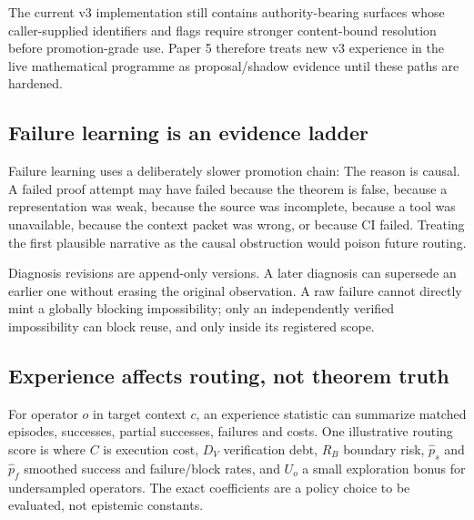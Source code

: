 The current v3 implementation still contains authority-bearing surfaces whose caller-supplied identifiers and flags require stronger content-bound resolution before promotion-grade use. Paper 5 therefore treats new v3 experience in the live mathematical programme as proposal/shadow evidence until these paths are hardened.

\subsection{Failure learning is an evidence ladder}

Failure learning uses a deliberately slower promotion chain:
The reason is causal. A failed proof attempt may have failed because the theorem is false, because a representation was weak, because the source was incomplete, because a tool was unavailable, because the context packet was wrong, or because CI failed. Treating the first plausible narrative as the causal obstruction would poison future routing.

Diagnosis revisions are append-only versions. A later diagnosis can supersede an earlier one without erasing the original observation. A raw failure cannot directly mint a globally blocking impossibility; only an independently verified impossibility can block reuse, and only inside its registered scope.

\subsection{Experience affects routing, not theorem truth}

For operator $o$ in target context $c$, an experience statistic can summarize matched episodes, successes, partial successes, failures and costs. One illustrative routing score is
where $C$ is execution cost, $D_V$ verification debt, $R_B$ boundary risk, $\widehat p_s$ and $\widehat p_f$ smoothed success and failure/block rates, and $U_o$ a small exploration bonus for undersampled operators. The exact coefficients are a policy choice to be evaluated, not epistemic constants.

